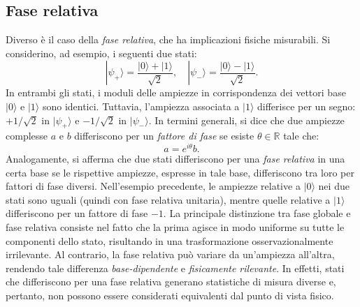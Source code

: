 \documentclass[a4paper,12pt]{report}
\theoremstyle{plain}
\begin{document}
\subsection*{Fase relativa}
Diverso è il caso della \emph{fase relativa}, che ha implicazioni fisiche misurabili. Si considerino, ad esempio, i seguenti due stati:
\begin{equation}
|\psi_+\rangle = \frac{|0\rangle + |1\rangle}{\sqrt{2}}, \quad
|\psi_-\rangle = \frac{|0\rangle - |1\rangle}{\sqrt{2}}. 
\end{equation}
In entrambi gli stati, i moduli delle ampiezze in corrispondenza dei vettori base \(|0\rangle\) e \(|1\rangle\) sono identici. Tuttavia, l'ampiezza associata a \(|1\rangle\) differisce per un segno: \(+1/\sqrt{2}\) in \(|\psi_+\rangle\) e \(-1/\sqrt{2}\) in \(|\psi_-\rangle\). In termini generali, si dice che due ampiezze complesse \(a\) e \(b\) differiscono per un \emph{fattore di fase} se esiste \(\theta \in \mathbb{R}\) tale che:
\[
a = e^{i\theta} b.
\]
Analogamente, si afferma che due stati differiscono per una \emph{fase relativa} in una certa base se le rispettive ampiezze, espresse in tale base, differiscono tra loro per fattori di fase diversi. Nell'esempio precedente, le ampiezze relative a \(|0\rangle\) nei due stati sono uguali (quindi con fase relativa unitaria), mentre quelle relative a \(|1\rangle\) differiscono per un fattore di fase \(-1\).
La principale distinzione tra fase globale e fase relativa consiste nel fatto che la prima agisce in modo uniforme su tutte le componenti dello stato, risultando in una trasformazione osservazionalmente irrilevante. Al contrario, la fase relativa può variare da un'ampiezza all'altra, rendendo tale differenza \emph{base-dipendente} e \emph{fisicamente rilevante}. In effetti, stati che differiscono per una fase relativa generano statistiche di misura diverse e, pertanto, non possono essere considerati equivalenti dal punto di vista fisico.
\end{document}
